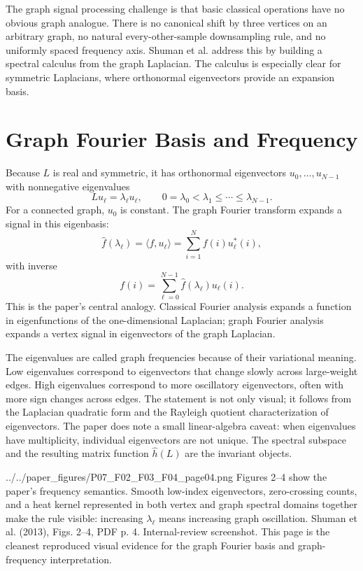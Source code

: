 \documentclass[11pt]{article}
\begin{document}
The graph signal processing challenge is that basic classical operations have
no obvious graph analogue.  There is no canonical shift by three vertices on
an arbitrary graph, no natural every-other-sample downsampling rule, and no
uniformly spaced frequency axis.  Shuman et al. address this by building a
spectral calculus from the graph Laplacian.  The calculus is especially clear
for symmetric Laplacians, where orthonormal eigenvectors provide an expansion
basis.

\section{Graph Fourier Basis and Frequency}

Because $L$ is real and symmetric, it has orthonormal eigenvectors
$u_0,\ldots,u_{N-1}$ with nonnegative eigenvalues
\[
  Lu_\ell = \lambda_\ell u_\ell,\qquad
  0=\lambda_0 < \lambda_1 \leq \cdots \leq \lambda_{N-1}.
\]
For a connected graph, $u_0$ is constant.  The graph Fourier transform expands
a signal in this eigenbasis:
\[
  \hat f(\lambda_\ell)
  =
  \langle f,u_\ell\rangle
  =
  \sum_{i=1}^{N} f(i)u_\ell^*(i),
\]
with inverse
\[
  f(i)=\sum_{\ell=0}^{N-1}\hat f(\lambda_\ell)u_\ell(i).
\]
This is the paper's central analogy.  Classical Fourier analysis expands a
function in eigenfunctions of the one-dimensional Laplacian; graph Fourier
analysis expands a vertex signal in eigenvectors of the graph Laplacian.

The eigenvalues are called graph frequencies because of their variational
meaning.  Low eigenvalues correspond to eigenvectors that change slowly across
large-weight edges.  High eigenvalues correspond to more oscillatory
eigenvectors, often with more sign changes across edges.  The statement is
not only visual; it follows from the Laplacian quadratic form and the Rayleigh
quotient characterization of eigenvectors.  The paper does note a small
linear-algebra caveat: when eigenvalues have multiplicity, individual
eigenvectors are not unique.  The spectral subspace and the resulting matrix
function $\hat h(L)$ are the invariant objects.

\paperfigure
  {../../paper_figures/P07_F02_F03_F04_page04.png}
  {Figures 2--4 show the paper's frequency semantics.  Smooth low-index
  eigenvectors, zero-crossing counts, and a heat kernel represented in both
  vertex and graph spectral domains together make the rule visible:
  increasing $\lambda_\ell$ means increasing graph oscillation.}
  {Shuman et al. (2013), Figs. 2--4, PDF p. 4.}
  {Internal-review screenshot.  This page is the cleanest reproduced visual
  evidence for the graph Fourier basis and graph-frequency interpretation.}
\end{document}
